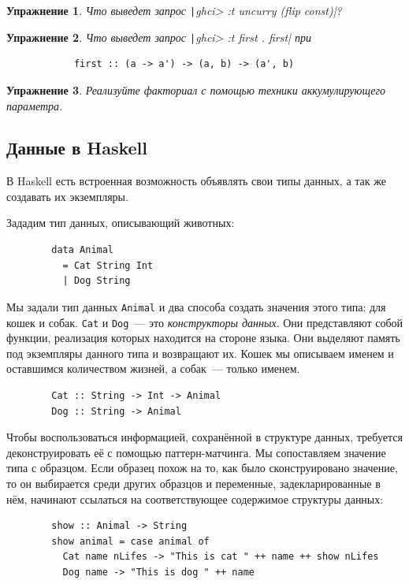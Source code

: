\documentclass[12pt]{article}
\newcommand{\point}[1]{{\color{blue}\textit{#1}}} %
\newtheorem{task}{Упражнение}
\begin{document}
    \begin{task}
        Что выведет запрос \texttt|ghci> :t uncurry (flip const)|?
    \end{task}

    \begin{task}
        Что выведет запрос \texttt|ghci> :t first . first| при
        \begin{verbatim}
            first :: (a -> a') -> (a, b) -> (a', b)
        \end{verbatim}
    \end{task}

    \begin{task}
        Реализуйте факториал с помощью техники аккумулирующего параметра.
    \end{task}

    \subsection{Данные в Haskell}

    В Haskell есть встроенная возможность объявлять свои типы данных, а так же создавать их экземпляры.

    Зададим тип данных, описывающий животных:
    \begin{verbatim}
        data Animal
          = Cat String Int
          | Dog String
    \end{verbatim}

    Мы задали тип данных \texttt{Animal} и два способа создать значения этого типа: для кошек и собак.
    \texttt{Cat} и \texttt{Dog}~--- это \point{конструкторы данных}.
    Они представляют собой функции, реализация которых находится на стороне языка.
    Они выделяют память под экземпляры данного типа и возвращают их.
    Кошек мы описываем именем и оставшимся количеством жизней, а собак~--- только именем.
    \begin{verbatim}
        Cat :: String -> Int -> Animal
        Dog :: String -> Animal
    \end{verbatim}

    Чтобы воспользоваться информацией, сохранённой в структуре данных, требуется деконструировать её с помощью паттерн-матчинга.
    Мы сопоставляем значение типа с образцом.
    Если образец похож на то, как было сконструировано значение, то он выбирается среди других образцов и переменные, задекларированные в нём, начинают ссылаться на соответствующее содержимое структуры данных:
    \begin{verbatim}
        show :: Animal -> String
        show animal = case animal of
          Cat name nLifes -> "This is cat " ++ name ++ show nLifes
          Dog name -> "This is dog " ++ name
    \end{verbatim}
\end{document}
